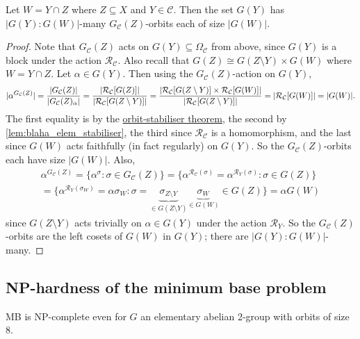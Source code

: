\begin{lemma}\label{lem:blaha_elem_orbits_size}
    Let $W = Y \cap Z$ where $Z \subseteq X$ and $Y \in \mathcal{C}$. Then the set $G(Y)$ has $|G(Y) : G(W)|$-many $G_\mathcal{C}(Z)$-orbits each of size $|G(W)|$.
\end{lemma}

\begin{proof}
    Note that $G_\mathcal{C}(Z)$ acts on $G(Y) \subseteq \Omega_\mathcal{C}$ from above, since $G(Y)$ is a block under the action $\mathcal{R}_\mathcal{C}$. Also recall that $G(Z) \cong G(Z \setminus Y) \times G(W)$ where $W = Y \cap Z$. Let $\alpha \in G(Y)$. Then using the $G_\mathcal{C}(Z)$-action on $G(Y)$,
    $$|\alpha^{G_\mathcal{C}(Z)}| = \frac{|G_\mathcal{C}(Z)|}{|\added{2}{G_\mathcal{C}(Z)_\alpha}|} = \frac{|\mathcal{R}_\mathcal{C}[G(Z)]|}{|\mathcal{R}_\mathcal{C}[G(Z \setminus Y)]|} = \frac{|\mathcal{R}_\mathcal{C}[G(Z \setminus Y)] \times \mathcal{R}_\mathcal{C}[G(W)]|}{|\mathcal{R}_\mathcal{C}[G(Z \setminus Y)]|} = |\mathcal{R}_\mathcal{C}[G(W)]| = |G(W)|.$$
    The first equality is by the \hyperref[thm:orbit_stabiliser]{orbit-stabiliser theorem}, the second by \autoref{lem:blaha_elem_stabiliser}, the third since $\mathcal{R}_\mathcal{C}$ is a homomorphism, and the last since $G(W)$ acts faithfully (in fact regularly) on $G(Y)$. So the $G_\mathcal{C}(Z)$-orbits each have size $|G(W)|$. Also,
    \begin{multline*}
        \alpha^{G_\mathcal{C}(Z)} = \{\alpha^\sigma : \sigma \in G_\mathcal{C}(Z)\} = \{\alpha^{\mathcal{R}_\mathcal{C}(\sigma)} = \alpha^{\mathcal{R}_Y(\sigma)} : \sigma \in G(Z)\} \\
        = \{\alpha^{\mathcal{R}_Y(\sigma_W)} = \alpha\sigma_W : \sigma = \underbrace{\sigma_{Z \setminus Y}}_{\in G(Z \setminus Y)}\underbrace{\sigma_W}_{\in G(W)} \in G(Z)\} = \alpha G(W)
    \end{multline*}
    since $G(Z \setminus Y)$ acts trivially  on $\alpha \in G(Y)$ under the action $\mathcal{R}_Y$. So the $G_\mathcal{C}(Z)$-orbits are the left cosets of $G(W)$ in $G(Y)$; there are $|G(Y) : G(W)|$-many.
\end{proof}

\subsection{NP-hardness of the minimum base problem}

\begin{theorem}\label{thm:blaha_elem_NP_complete}
    MB is NP-complete even for $G$ an elementary abelian 2-group with orbits of size 8.
\end{theorem}

